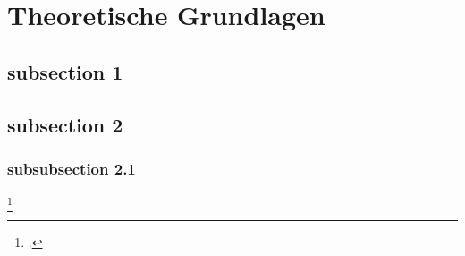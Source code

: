 \section{Theoretische Grundlagen}

\subsection{subsection 1}

\subsection{subsection 2}

\subsubsection{subsubsection 2.1}

\footcite[Test]{}


\iffalse
Hey, I'm a block comment!
\fi